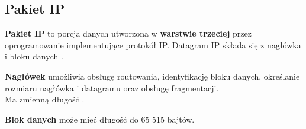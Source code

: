 \documentclass[../sk-egzamin.tex]{subfiles}
\begin{document}

\subsection*{Pakiet IP}
\textbf{Pakiet IP} to porcja danych utworzona w \textbf{warstwie trzeciej}
 przez oprogramowanie implementujące protokół IP.
Datagram IP składa się z nagłówka  i bloku danych
.

\textbf{Nagłówek} umożliwia obsługę routowania, identyfikację bloku danych,
określanie rozmiaru nagłówka i datagramu oraz obsługę fragmentacji.\\
Ma zmienną długość .

\textbf{Blok danych} może mieć długość do 65 515 bajtów.
\end{document}
